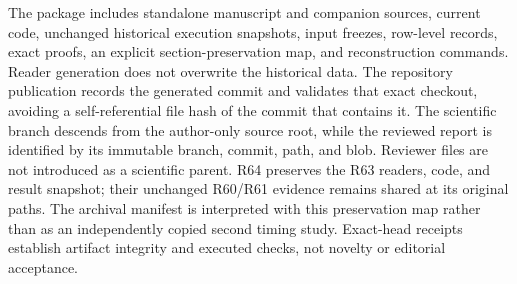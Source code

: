 \documentclass[11pt,letterpaper]{article}
\theoremstyle{definition}\newtheorem{remark}[theorem]{Remark}
\begin{document}
The package includes standalone manuscript and companion sources, current code, unchanged historical execution snapshots, input freezes, row-level records, exact proofs, an explicit section-preservation map, and reconstruction commands. Reader generation does not overwrite the historical data. The repository publication records the generated commit and validates that exact checkout, avoiding a self-referential file hash of the commit that contains it. The scientific branch descends from the author-only source root, while the reviewed report is identified by its immutable branch, commit, path, and blob. Reviewer files are not introduced as a scientific parent. R64 preserves the R63 readers, code, and result snapshot; their unchanged R60/R61 evidence remains shared at its original paths. The archival manifest is interpreted with this preservation map rather than as an independently copied second timing study. Exact-head receipts establish artifact integrity and executed checks, not novelty or editorial acceptance.
\clearpage{}\label{ec-refs-start}
\end{document}
